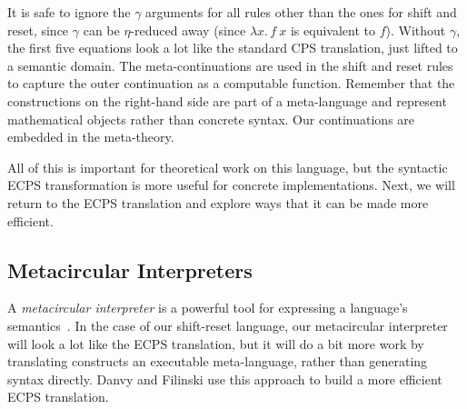 \documentclass[acmsmall, nonacm, screen]{acmart}
\newcommand{\lambdaE}[2]{\lambda #1.\, #2}
\begin{document}
It is safe to ignore the $\gamma$ arguments for all rules other than the ones for shift and
reset, since $\gamma$ can be $\eta$-reduced away (since $\lambdaE{x}{f~x}$ is equivalent to $f$).
Without $\gamma$, the first five equations look a lot like the standard CPS translation, just
lifted to a semantic domain. The meta-continuations are used in the shift and reset rules to
capture the outer continuation as a computable function. Remember that the constructions on the
right-hand side are part of a meta-language and represent mathematical objects rather than
concrete syntax. Our continuations are embedded in the meta-theory.

All of this is important for theoretical work on this language, but the syntactic ECPS
transformation is more useful for concrete implementations. Next, we will return to the ECPS
translation and explore ways that it can be made more efficient.

\subsection{Metacircular Interpreters}
A {\em metacircular interpreter} is a powerful tool for expressing a language's
semantics~\cite{reynolds1972definitional}. In the case of our shift-reset language, our
metacircular interpreter will look a lot like the ECPS translation, but it will do a bit more
work by translating constructs an executable meta-language, rather than generating syntax
directly. Danvy and Filinski use this approach to build a more efficient ECPS translation.
\end{document}
